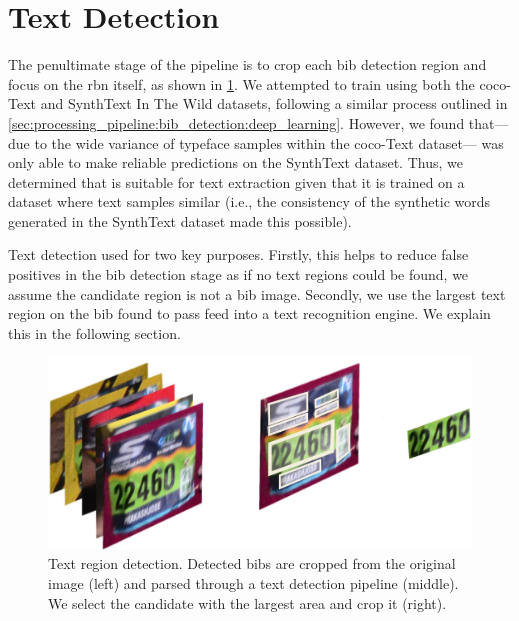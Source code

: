 


\section{Text Detection}

The penultimate stage of the pipeline is to crop each bib detection region and focus on the \gls{rbn} itself, as shown in \cref{fig:processing_pipeline:text_detection}. We attempted to train \frcnn{} using both the \gls{coco}-Text \citep{Veit:2016vj} and SynthText In The Wild \citep{Gupta:2016ws} datasets, following a similar process outlined in \cref{sec:processing_pipeline:bib_detection:deep_learning}. However, we found that---due to the wide variance of typeface samples within the \gls{coco}-Text dataset---\frcnn{} was only able to make reliable predictions on the SynthText dataset. Thus, we determined that \frcnn{} is suitable for text extraction given that it is trained on a dataset where text samples similar (i.e., the consistency of the synthetic words generated in the SynthText dataset made this possible).

Text detection used for two key purposes. Firstly, this helps to reduce false positives in the bib detection stage as if no text regions could be found, we assume the candidate region is not a bib image. Secondly, we use the largest text region on the bib found to pass feed into a text recognition engine. We explain this in the following section.

\begin{figure}[h]
  \centering
  \includegraphics[width=\textwidth]{images/processing/text_process}
  \caption[Text region detection pipeline]{Text region detection. Detected bibs are cropped from the original image (left) and parsed through a text detection pipeline (middle). We select the candidate with the largest area and crop it (right).}
  \label{fig:processing_pipeline:text_detection}
\end{figure}

